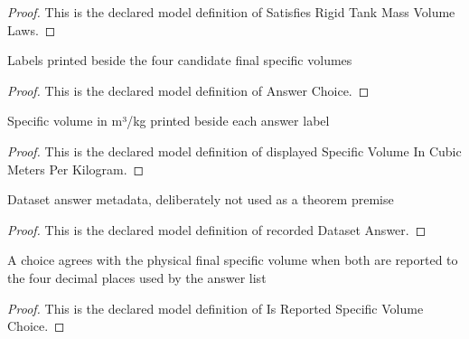 \begin{proof}
  This is the declared model definition of Satisfies Rigid Tank Mass Volume Laws.
\end{proof}
\begin{definition}
  \label{def:physics:phyx-mini-0439:phyxminiproblems-problemphyxmini0439-answerchoice}
  Labels printed beside the four candidate final specific volumes
\end{definition}
\begin{proof}
  This is the declared model definition of Answer Choice.
\end{proof}
\begin{definition}
  \label{def:physics:phyx-mini-0439:phyxminiproblems-problemphyxmini0439-displayedspecificvolumeincubicmetersperkilogram}
  Specific volume in m³/kg printed beside each answer label
\end{definition}
\begin{proof}
  This is the declared model definition of displayed Specific Volume In Cubic Meters Per Kilogram.
\end{proof}
\begin{definition}
  \label{def:physics:phyx-mini-0439:phyxminiproblems-problemphyxmini0439-recordeddatasetanswer}
  Dataset answer metadata, deliberately not used as a theorem premise
\end{definition}
\begin{proof}
  This is the declared model definition of recorded Dataset Answer.
\end{proof}
\begin{definition}
  \label{def:physics:phyx-mini-0439:phyxminiproblems-problemphyxmini0439-isreportedspecificvolumechoice}
  A choice agrees with the physical final specific volume when both are reported to the four decimal places used by the answer list
\end{definition}
\begin{proof}
  This is the declared model definition of Is Reported Specific Volume Choice.
\end{proof}
